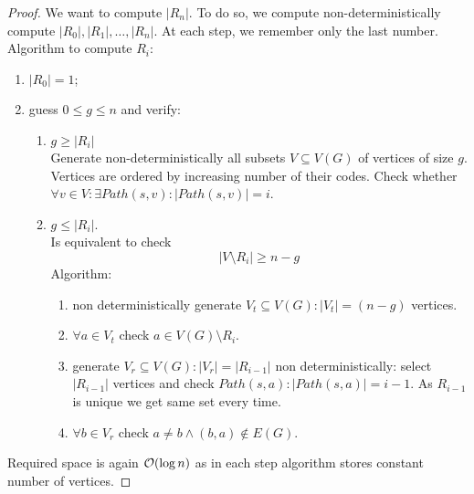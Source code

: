 \begin{proof}
	We want to compute $|R_n|$.
	To do so, we compute non-deterministically compute $|R_0|, |R_1|, \ldots, |R_n|$.
	At each step, we remember only the last number.
	Algorithm to compute $R_i$:
	\begin{enumerate}
		\item $|R_0| = 1$;
		\item guess $0 \leq g \leq n$ and verify:
			\begin{enumerate}
				\item $g \geq |R_i|$\\
					Generate non-deterministically all subsets $V \subseteq V(G)$ of vertices of size $g$.
					Vertices are ordered by increasing number of their codes.
					Check whether $\forall v \in V: \exists Path(s, v): |Path(s, v)| = i$.
				\item $g \leq |R_i|$.\\
					Is equivalent to check
					\[ |V \setminus R_i| \geq n - g \]
					Algorithm:
					\begin{enumerate}
						\item non deterministically generate $V_t \subseteq V(G): |V_t| = (n - g)$ vertices.
						\item $\forall a \in V_t$ check $a \in V(G) \setminus R_i$.
						\item generate $V_r \subseteq V(G): |V_r| = |R_{i - 1}|$ non deterministically: select $|R_{i - 1}|$ vertices and check $Path(s, a): |Path(s, a)| = i - 1$.
							As $R_{i-1}$ is unique we get same set every time.
						\item $\forall b \in V_r$ check $a \ne b \land (b, a) \notin E(G)$.
					\end{enumerate}
			\end{enumerate}
	\end{enumerate}

	Required space is again $\mathcal{O}(\log n)$ as in each step algorithm stores constant number of vertices.
\end{proof}
